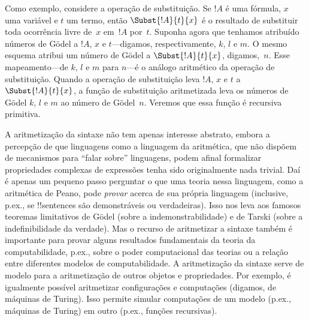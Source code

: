 \documentclass[../../../include/open-logic-section]{subfiles}
\begin{document}
Como exemplo, considere a operação de substituição. Se $!A$ é uma
fórmula, $x$ uma variável e $t$ um termo, então $\Subst{!A}{t}{x}$ é o
resultado de substituir toda ocorrência livre de~$x$ em~$!A$ por~$t$.
Suponha agora que tenhamos atribuído números de G\"odel a $!A$, $x$ e
$t$---digamos, respectivamente, $k$, $l$ e $m$. O mesmo esquema atribui
um número de G\"odel a $\Subst{!A}{t}{x}$, digamos,~$n$. Esse
mapeamento---de $k$, $l$ e $m$ para $n$---é o análogo aritmético da
operação de substituição. Quando a operação de substituição leva $!A$,
$x$ e $t$ a $\Subst{!A}{t}{x}$, a função de substituição aritmetizada
leva os números de G\"odel $k$, $l$ e $m$ ao número de G\"odel~$n$.
Veremos que essa função é recursiva primitiva.

A aritmetização da sintaxe não tem apenas interesse abstrato, embora a
percepção de que linguagens como a linguagem da aritmética, que não
dispõem de mecanismos para ``falar sobre'' linguagens, podem afinal
formalizar propriedades complexas de expressões tenha sido
originalmente nada trivial. Daí é apenas um pequeno passo perguntar o
que uma teoria nessa linguagem, como a aritmética de Peano, pode
\emph{provar} acerca de sua própria linguagem (inclusive, p.ex.,
se !!{sentence}s são demonstráveis ou verdadeiras). Isso nos leva aos
famosos teoremas limitativos de G\"odel (sobre a indemonstrabilidade) e
de Tarski (sobre a indefinibilidade da verdade). Mas o recurso de
aritmetizar a sintaxe também é importante para provar alguns resultados
fundamentais da teoria da computabilidade, p.ex., sobre o poder
computacional das teorias ou a relação entre diferentes modelos de
computabilidade. A aritmetização da sintaxe serve de modelo para a
aritmetização de outros objetos e propriedades. Por exemplo, é
igualmente possível aritmetizar configurações e computações (digamos,
de máquinas de Turing). Isso permite simular computações de um modelo
(p.ex., máquinas de Turing) em outro (p.ex., funções
recursivas).
\end{document}
